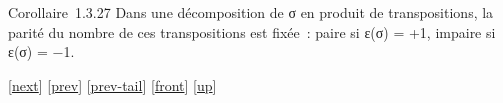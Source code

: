 \documentclass[]{article}
\begin{document}
Corollaire~1.3.27 Dans une décomposition de σ en produit de
transpositions, la parité du nombre de ces transpositions est fixée~:
paire si ε(σ) = +1, impaire si ε(σ) = −1.

{[}\href{coursse4.html}{next}{]} {[}\href{coursse2.html}{prev}{]}
{[}\href{coursse2.html\#tailcoursse2.html}{prev-tail}{]}
{[}\href{coursse3.html}{front}{]}
{[}\href{coursch2.html\#coursse3.html}{up}{]}
\end{document}
